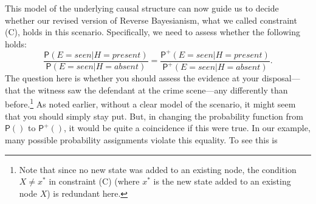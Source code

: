 \documentclass[
  11pt,
  dvipsnames,enabledeprecatedfontcommands, todos]{scrartcl}
\newcommand{\pr}[1]{\ensuremath{\mathsf{P}(#1)}}
\newcommand{\ppr}[2]{\ensuremath{\mathsf{P}^{#1}(#2)}}
\begin{document}
This model of the underlying causal structure can now guide us to decide
whether our revised version of Reverse Bayesianism, what we called
constraint (C), holds in this scenario. Specifically, we need to assess
whether the following holds:
\[\frac{\pr{E=seen \vert H=present}}{\pr{E=seen \vert H=absent}}= \frac{\ppr{+}{E=seen \vert H=present}}{\ppr{+}{E=seen \vert H=absent}}.\]
The question here is whether you should assess the evidence at your
disposal---that the witness saw the defendant at the crime scene---any
differently than before.\footnote{Note that since no new state was added
  to an existing node, the condition \(X\neq x^*\) in constraint (C)
  (where \(x^*\) is the new state added to an existing node \(X\)) is
  redundant here.} As noted earlier, without a clear model of the
scenario, it might seem that you should simply stay put. But, in
changing the probability function from \(\pr{}\) to \(\ppr{+}{}\), it
would be quite a coincidence if this were true. In our example, many
possible probability assignments violate this equality. To see this is
\end{document}
